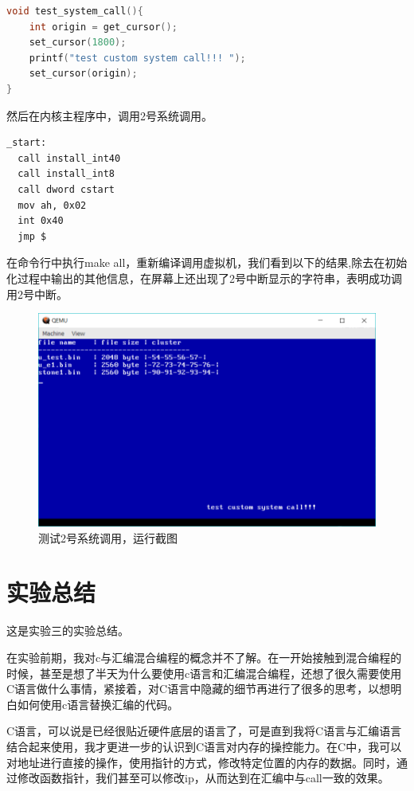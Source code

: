 \documentclass[forprint]{WHUBachelor}
\begin{document}
\begin{lstlisting}[language=c]
  void test_system_call(){
    int origin = get_cursor();
    set_cursor(1800);
    printf("test custom system call!!! ");
    set_cursor(origin);
}
\end{lstlisting}

然后在内核主程序中，调用2号系统调用。

\begin{lstlisting}[language={[x86masm]Assembler}]
_start:
  call install_int40
  call install_int8
  call dword cstart
  mov ah, 0x02
  int 0x40
  jmp $
\end{lstlisting}

在命令行中执行make all，重新编译调用虚拟机，我们看到以下的结果,除去在初始化过程中输出的其他信息，在屏幕上还出现了2号中断显示的字符串，表明成功调用2号中断。

\begin{figure}[htp]
  \centering
  \includegraphics[width=13cm]{"./figure/test_system_call.png"}
  \caption{测试2号系统调用，运行截图}
  \label{fig:test-system_call}
\end{figure}

\chapter{实验总结}

这是实验三的实验总结。

在实验前期，我对c与汇编混合编程的概念并不了解。在一开始接触到混合编程的时候，甚至是想了半天为什么要使用c语言和汇编混合编程，还想了很久需要使用C语言做什么事情，紧接着，对C语言中隐藏的细节再进行了很多的思考，以想明白如何使用c语言替换汇编的代码。

C语言，可以说是已经很贴近硬件底层的语言了，可是直到我将C语言与汇编语言结合起来使用，我才更进一步的认识到C语言对内存的操控能力。在C中，我可以对地址进行直接的操作，使用指针的方式，修改特定位置的内存的数据。同时，通过修改函数指针，我们甚至可以修改ip，从而达到在汇编中与call一致的效果。
\end{document}
